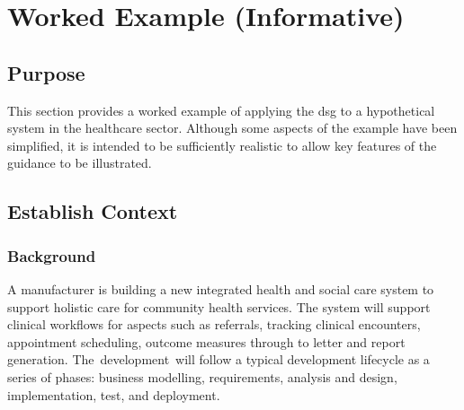 %
%
\section{Worked Example (Informative)} \label{bkm:workedexample}


\subsection{Purpose}
This section provides a worked example of applying the \gls{dsg} to a hypothetical system in the healthcare sector. Although some aspects of the example have been simplified, it is intended to be sufficiently realistic to allow key features of the guidance to be illustrated.

\subsection{Establish Context}

\subsubsection{Background}
A manufacturer is building a new integrated health and social care system to support holistic care for community health services. The system will support clinical workflows for aspects such as referrals, tracking clinical encounters, appointment scheduling, outcome measures through to letter and report generation. The\cbstart\ development\cbend\ will follow a typical development lifecycle as a series of phases: business modelling, requirements, analysis and design, implementation, test, and deployment. 


